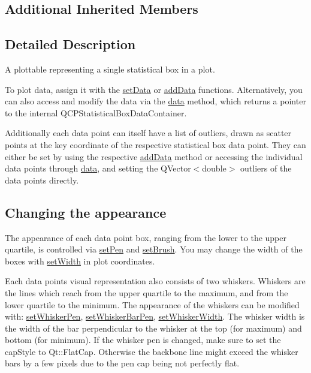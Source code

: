 \subsection*{Additional Inherited Members}


\subsection{Detailed Description}
A plottable representing a single statistical box in a plot. 



To plot data, assign it with the \hyperlink{classQCPStatisticalBox_a08a6da55822bad825ee25a8069b9b52f}{set\+Data} or \hyperlink{classQCPStatisticalBox_a9a8739c5b8291db8fd839e892fc8f478}{add\+Data} functions. Alternatively, you can also access and modify the data via the \hyperlink{classQCPStatisticalBox_a99de828ddad81bb79aaed7db54b87e3f}{data} method, which returns a pointer to the internal Q\+C\+P\+Statistical\+Box\+Data\+Container.

Additionally each data point can itself have a list of outliers, drawn as scatter points at the key coordinate of the respective statistical box data point. They can either be set by using the respective \hyperlink{classQCPStatisticalBox_a026f2790b530d6f29312254ecb1e7c1e}{add\+Data} method or accessing the individual data points through \hyperlink{classQCPStatisticalBox_a99de828ddad81bb79aaed7db54b87e3f}{data}, and setting the {\ttfamily Q\+Vector$<$double$>$ outliers} of the data points directly.\hypertarget{classQCPStatisticalBox_qcpstatisticalbox-appearance}{}\subsection{Changing the appearance}\label{classQCPStatisticalBox_qcpstatisticalbox-appearance}
The appearance of each data point box, ranging from the lower to the upper quartile, is controlled via \hyperlink{classQCPAbstractPlottable_ab74b09ae4c0e7e13142fe4b5bf46cac7}{set\+Pen} and \hyperlink{classQCPAbstractPlottable_a7a4b92144dca6453a1f0f210e27edc74}{set\+Brush}. You may change the width of the boxes with \hyperlink{classQCPStatisticalBox_a0b62775bd67301b1eba5c785f2b26f14}{set\+Width} in plot coordinates.

Each data point\textquotesingle{}s visual representation also consists of two whiskers. Whiskers are the lines which reach from the upper quartile to the maximum, and from the lower quartile to the minimum. The appearance of the whiskers can be modified with\+: \hyperlink{classQCPStatisticalBox_a4a5034cb3b9b040444df05ab1684620b}{set\+Whisker\+Pen}, \hyperlink{classQCPStatisticalBox_aa8d3e503897788e1abf68dc74b5f147f}{set\+Whisker\+Bar\+Pen}, \hyperlink{classQCPStatisticalBox_adf378812446bd66f34d1f7f293d991cd}{set\+Whisker\+Width}. The whisker width is the width of the bar perpendicular to the whisker at the top (for maximum) and bottom (for minimum). If the whisker pen is changed, make sure to set the {\ttfamily cap\+Style} to {\ttfamily Qt\+::\+Flat\+Cap}. Otherwise the backbone line might exceed the whisker bars by a few pixels due to the pen cap being not perfectly flat.

